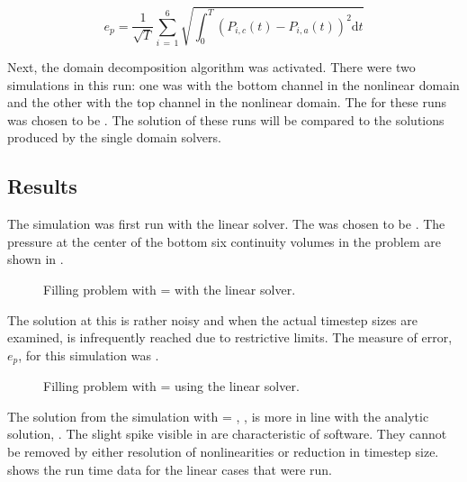 \begin{equation}
\label{eqn:vpmPressureError}
e_{p} =  \frac{1}{\sqrt{T}} \sum_{i\,=\,1}^{6}\sqrt{\int_{0}^{T} \left(P_{i,c}(t) - P_{i,a}(t)\right)^{2} \mathrm{d} t}
\end{equation}

Next, the domain decomposition algorithm was activated.
There were two simulations in this run: one was with the bottom channel in the nonlinear domain and the other with the top channel in the nonlinear domain.
The \dtmax{} for these runs was chosen to be .
The solution of these runs will be compared to the solutions produced by the single domain solvers.

\subsection{Results}
\label{subsect:vmpResults}

The simulation was first run with the linear solver.
The \dtmax{} was chosen to be .
The pressure at the center of the bottom six continuity volumes in the problem are shown in .

\begin{figure}[h!tb]
\centering

\caption{Filling problem with \dtmax{} =  with the linear solver.}
\label{fig:linFill1em1}
\end{figure}

The solution at this \dtmax{} is rather noisy and when the actual timestep sizes are examined, \dtmax{} is infrequently reached due to restrictive \dtcrnt{} limits.
The measure of error, $e_{p}$, for this simulation was .

\begin{figure}[h!tb]
\centering

\caption{Filling problem with \dtmax{} =  using the linear solver.}
\label{fig:vmpLinFill5em2}
\end{figure}

The solution from the simulation with \dtmax{} = , , is more in line with the analytic solution, .
The slight spike visible in  are characteristic of \cobra{} software.
They cannot be removed by either resolution of nonlinearities or reduction in timestep size.
 shows the run time data for the linear cases that were run.

